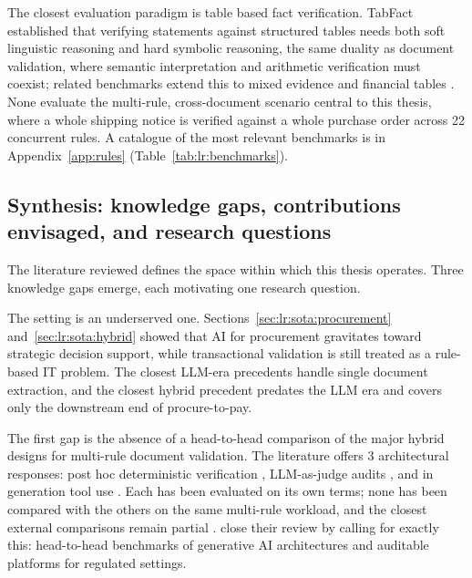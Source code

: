 The closest evaluation paradigm is table based fact verification. TabFact \citep{chen2020tabfact} established that verifying statements against structured tables needs both soft linguistic reasoning and hard symbolic reasoning, the same duality as document validation, where semantic interpretation and arithmetic verification must coexist; related benchmarks extend this to mixed evidence and financial tables \citep{aly2021,zhu2021,chen2021finqa}. None evaluate the multi-rule, cross-document scenario central to this thesis, where a whole shipping notice is verified against a whole purchase order across 22 concurrent rules. A catalogue of the most relevant benchmarks is in Appendix~\ref{app:rules} (Table~\ref{tab:lr:benchmarks}).


\subsection{Synthesis: knowledge gaps, contributions envisaged, and research questions}
\label{sec:lr:synthesis}

The literature reviewed defines the space within which this thesis operates. Three knowledge gaps emerge, each motivating one research question.

The setting is an underserved one. Sections~\ref{sec:lr:sota:procurement} and~\ref{sec:lr:sota:hybrid} showed that AI for procurement gravitates toward strategic decision support, while transactional validation is still treated as a rule-based IT problem. The closest LLM-era precedents \citep{loukil2024,berghaus2025,hasan2025} handle single document extraction, and the closest hybrid precedent \citep{kanaparthi2023} predates the LLM era and covers only the downstream end of procure-to-pay.

The first gap is the absence of a head-to-head comparison of the major hybrid designs for multi-rule document validation. The literature offers 3 architectural responses: post hoc deterministic verification \citep{prenosil2025,tarannum2026,bayless2025}, LLM-as-judge audits \citep{zheng2023,liu2023geval,kim2024}, and in generation tool use \citep{schick2024,lyu2023,goodell2025}. Each has been evaluated on its own terms; none has been compared with the others on the same multi-rule workload, and the closest external comparisons remain partial \citep{goodell2025,sadowski2026,stechly2024}. \citet{bahroun2026} close their review by calling for exactly this: head-to-head benchmarks of generative AI architectures and auditable platforms for regulated settings.

